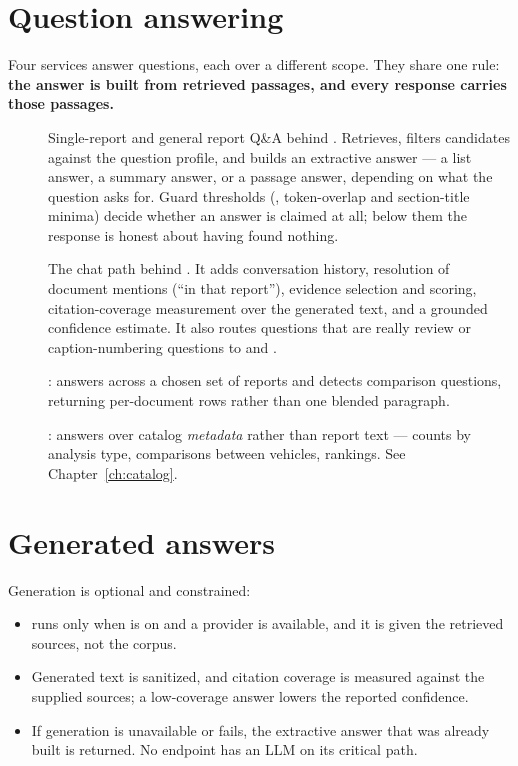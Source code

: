\section{Question answering}

Four services answer questions, each over a different scope. They share one
rule: \textbf{the answer is built from retrieved passages, and every response
carries those passages.}

\begin{description}
\item[] Single-report and general report Q\&A behind
. Retrieves, filters candidates against the question profile,
and builds an extractive answer --- a list answer, a summary answer, or a passage
answer, depending on what the question asks for. Guard thresholds
(, token-overlap and section-title minima) decide
whether an answer is claimed at all; below them the response is honest about
having found nothing.

\item[] The chat path behind
. It adds conversation history, resolution of document
mentions (``in that report''), evidence selection and scoring,
citation-coverage measurement over the generated text, and a grounded confidence
estimate. It also routes questions that are really review or caption-numbering
questions to  and .

\item[] : answers
across a chosen set of reports and detects comparison questions, returning
per-document rows rather than one blended paragraph.

\item[]
: answers over catalog \emph{metadata} rather than
report text --- counts by analysis type, comparisons between vehicles,
rankings. See Chapter~\ref{ch:catalog}.
\end{description}

\section{Generated answers}

Generation is optional and constrained:

\begin{itemize}
\item {} runs only when  is
on and a provider is available, and it is given the retrieved sources, not the
corpus.
\item Generated text is sanitized, and citation coverage is measured against the
supplied sources; a low-coverage answer lowers the reported confidence.
\item If generation is unavailable or fails, the extractive answer that was
already built is returned. No endpoint has an LLM on its critical path.
\end{itemize}

